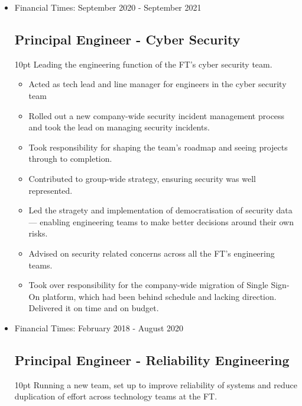 \documentclass[a4paper]{article}
\newenvironment{detail}{\begin{adjustwidth}{10pt}{}}{\end{adjustwidth}}
\begin{document}
\begin{itemize}
\item Financial Times: September 2020 - September 2021
\subsection*{Principal Engineer - Cyber Security}
\begin{detail}
Leading the engineering function of the FT's cyber security team.

\begin{itemize}
	\item Acted as tech lead and line manager for engineers in the cyber security team
	\item Rolled out a new company-wide security incident management process and took the lead on managing security incidents.
	\item Took responsibility for shaping the team's roadmap and seeing projects through to completion.
	\item Contributed to group-wide strategy, ensuring security was well represented.
	\item Led the stragety and implementation of democratisation of security data — enabling engineering teams to make better decisions around their own risks.
	\item Advised on security related concerns across all the FT's engineering teams.
	\item Took over responsibility for the company-wide migration of Single Sign-On platform, which had been behind schedule and lacking direction.  Delivered it on time and on budget.
\end{itemize}
\end{detail}

\pagebreak

\item Financial Times: February 2018 - August 2020
\subsection*{Principal Engineer - Reliability Engineering}
\begin{detail}
Running a new team, set up to improve reliability of systems and reduce duplication of effort across technology teams at the FT.


\end{detail}
\end{itemize}
\end{document}
